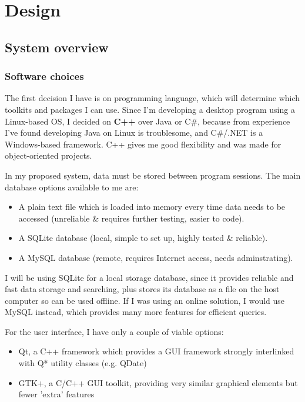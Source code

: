 \section{Design}
\subsection{System overview}
\subsubsection{Software choices}

The first decision I have is on programming language, which will determine which
toolkits and packages I can use. Since I'm developing a desktop program using a
Linux-based OS, I decided on \textbf{C++} over Java or C\#, because from
experience I've found developing Java on Linux is troublesome, and C\#/.NET is a
Windows-based framework. C++ gives me good flexibility and was made for
object-oriented projects.

In my proposed system, data must be stored between program sessions. The main
database options available to me are:

\begin{itemize}
    \item A plain text file which is loaded into memory every time data needs to
        be accessed (unreliable \& requires further testing, easier to code).
    \item A SQLite database (local, simple to set up, highly tested \&
          reliable).
    \item A MySQL database (remote, requires Internet access, needs
          adminstrating).
\end{itemize}

I will be using SQLite for a local storage database, since it provides reliable
and fast data storage and searching, plus stores its database as a file on the
host computer so can be used offline. If I was using an online solution, I would
use MySQL instead, which provides many more features for efficient queries.

For the user interface, I have only a couple of viable options:

\begin{itemize}
    \item Qt, a C++ framework which provides a GUI framework strongly
          interlinked with Q* utility classes (e.g. QDate)
    \item GTK+, a C/C++ GUI toolkit, providing very similar graphical elements
          but fewer 'extra' features
\end{itemize}

